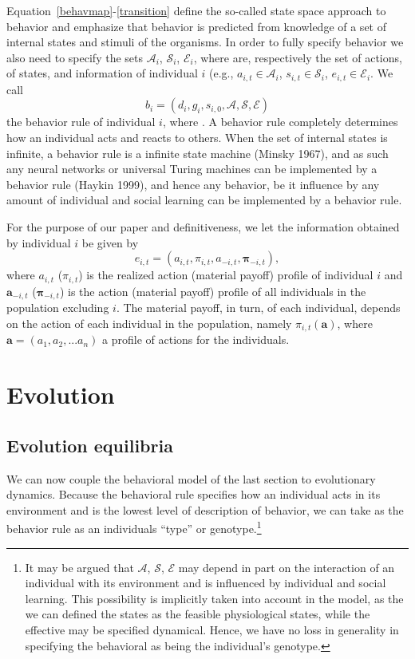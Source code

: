 \documentclass[12pt]{article}
\newcommand{\pa}{\pi}
\newcommand{\pav}{\boldsymbol{\pi}}
\newcommand{\br}{b}
\begin{document}
Equation~\ref{behavmap}-\ref{transition} define the so-called state space approach to behavior and emphasize that behavior is predicted from knowledge of a set of internal states and stimuli of the organisms. In order to fully specify behavior we also need to specify the sets $\mathcal{A}_i$, $\mathcal{S}_i$, $\mathcal{E}_i$, where are, respectively the set of actions, of states, and information of individual $i$ (e.g., $a_{i,t} \in \mathcal{A}_i$, $s_{i,t} \in \mathcal{S}_i$, $e_{i,t} \in \mathcal{E}_i$. We call 
\begin{equation}
\br_i = (d_{i} , g_i , s_{i,0} , \mathcal{A} , \mathcal{S} ,  \mathcal{E})
\end{equation}
the behavior
rule of individual $i$, where . A behavior rule completely determines how an individual acts and reacts to others. When the set of internal states is
infinite, a behavior rule is a infinite state machine
(Minsky 1967), and as such any neural networks or universal Turing
machines can be implemented by a behavior rule (Haykin 1999), and hence any behavior, be it influence by any amount of individual and social learning can be implemented by a behavior rule.

For the purpose of our paper and definitiveness, we let the information obtained by individual $i$ be given by
\begin{equation}
e_{i,t}=(a_{i,t},\pa_{i,t},a_{-i,t},\pav_{-i,t}),  \label{transition}
\end{equation}
where $a_{i,t}$ ($\pa_{i,t}$) is the realized action (material payoff) profile of individual $i$ and $\mathbf{a}_{-i,t}$ ($\pav_{-i,t}$)  is the action (material payoff) profile of all individuals in the population excluding $i$. The material payoff, in turn, of each individual, depends on the action of each individual in the population, namely $\pa_{i,t}(\mathbf{a})$, where $\mathbf{a}=(a_1,a_2,...a_n)$ a profile of actions for the individuals. 

\section*{Evolution}


\subsection*{Evolution equilibria}

We can now couple the behavioral model of the last section to evolutionary dynamics. Because the behavioral rule specifies how an individual acts in its environment and is the lowest level of description of behavior, we can take as the behavior rule as an individuals ``type'' or genotype.\footnote{It may be argued that $\mathcal{A}$, $\mathcal{S}$, $\mathcal{E}$ may depend in part on the interaction of an individual with its environment and is influenced by individual and social learning. This possibility is implicitly taken into account in the model, as the we can defined the states as the feasible physiological states, while the effective may be specified dynamical. Hence, we have no loss in generality in specifying the behavioral as being the individual's genotype.  }
\end{document}
